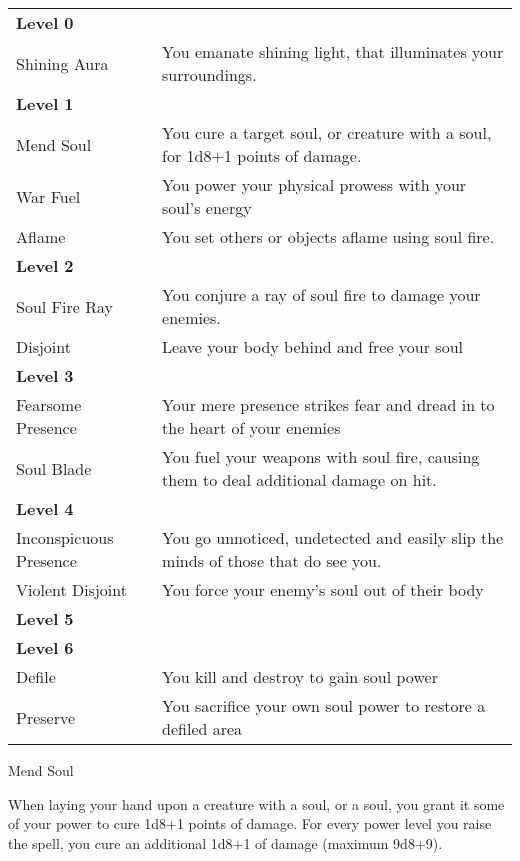 \begin{table*}[!htb]
  \caption{Soul Powers}
  \begin{tabular}{p{4cm} p{11cm}}
    \textbf{Level 0} & \nobreak \\
    Shining Aura     & You emanate shining light, that illuminates your surroundings. \\
    \textbf{Level 1} & \nobreak \\
    Mend Soul        & You cure a target soul, or creature with a soul, for 1d8+1 points of damage. \\
    War Fuel         & You power your physical prowess with your soul's energy \\
    Aflame           & You set others or objects aflame using soul fire. \\
    \textbf{Level 2} & \nobreak \\
    Soul Fire Ray    & You conjure a ray of soul fire to damage your enemies. \\
    Disjoint         & Leave your body behind and free your soul \\
    \textbf{Level 3} & \nobreak \\
    Fearsome Presence& Your mere presence strikes fear and dread in to the heart of your enemies \\
    Soul Blade       & You fuel your weapons with soul fire, causing them to deal additional damage on hit. \\
    \textbf{Level 4} & \nobreak \\
    Inconspicuous Presence & You go unnoticed, undetected and easily slip the minds of those that do see you. \\
    Violent Disjoint & You force your enemy's soul out of their body \\
    \textbf{Level 5} & \nobreak \\
    \textbf{Level 6} & \nobreak \\
    Defile           & You kill and destroy to gain soul power \\
    Preserve         & You sacrifice your own soul power to restore a defiled area \\
  \end{tabular}
\end{table*}

\begin{soulpower}{Mend Soul}
  \rangetouch
  \instantaneous

  When laying your hand upon a creature with a soul, or a soul, you grant it
  some of your power to cure 1d8+1 points of damage. For every power level you
  raise the spell, you cure an additional 1d8+1 of damage (maximum 9d8+9).
\end{soulpower}

